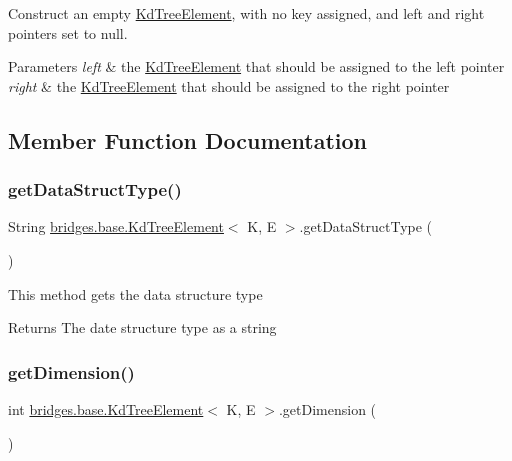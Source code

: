 Construct an empty \hyperlink{classbridges_1_1base_1_1_kd_tree_element}{Kd\+Tree\+Element}, with no key assigned, and left and right pointers set to null. 
\begin{DoxyParams}{Parameters}
{\em left} & the \hyperlink{classbridges_1_1base_1_1_kd_tree_element}{Kd\+Tree\+Element} that should be assigned to the left pointer \\
\hline
{\em right} & the \hyperlink{classbridges_1_1base_1_1_kd_tree_element}{Kd\+Tree\+Element} that should be assigned to the right pointer \\
\hline
\end{DoxyParams}


\subsection{Member Function Documentation}
\mbox{\label{classbridges_1_1base_1_1_kd_tree_element_a56b98bd1f3e1e5c0c37519c4b3cf5ba2}} 
\subsubsection{\texorpdfstring{get\+Data\+Struct\+Type()}{getDataStructType()}}
{\footnotesize\ttfamily String \hyperlink{classbridges_1_1base_1_1_kd_tree_element}{bridges.\+base.\+Kd\+Tree\+Element}$<$ K, E $>$.get\+Data\+Struct\+Type (\begin{DoxyParamCaption}{ }\end{DoxyParamCaption})}

This method gets the data structure type

\begin{DoxyReturn}{Returns}
The date structure type as a string 
\end{DoxyReturn}
\mbox{\label{classbridges_1_1base_1_1_kd_tree_element_a2469fcfe38e921ae48338ef1fd347c4a}} 
\subsubsection{\texorpdfstring{get\+Dimension()}{getDimension()}}
{\footnotesize\ttfamily int \hyperlink{classbridges_1_1base_1_1_kd_tree_element}{bridges.\+base.\+Kd\+Tree\+Element}$<$ K, E $>$.get\+Dimension (\begin{DoxyParamCaption}{ }\end{DoxyParamCaption})}

